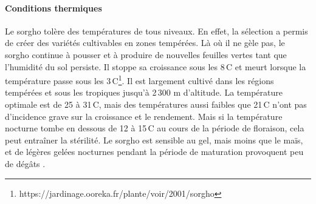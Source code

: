 \documentclass[a4paper,11pt]{article}
\begin{document}
\paragraph{Conditions thermiques} Le sorgho tolère des températures de
tous niveaux. En effet, la sélection a permis de créer des variétés
cultivables en zones tempérées. Là où il ne gèle pas, le sorgho
continue à pousser et à produire de nouvelles feuilles vertes tant que
l'humidité du sol persiste. Il stoppe sa croissance sous les
8\,\degree{}C et meurt lorsque la température passe sous les
3\,\degree{}C\footnote{https://jardinage.ooreka.fr/plante/voir/2001/sorgho}. Il
est largement cultivé dans les régions tempérées et sous les tropiques
jusqu'à 2\,300 m d'altitude. La température optimale est de 25 à
31\,\degree{}C, mais des températures aussi faibles que 21\,\degree{}C
n'ont pas d'incidence grave sur la croissance et le rendement. Mais si
la température nocturne tombe en dessous de 12 à 15\,\degree{}C au
cours de la période de floraison, cela peut entraîner la stérilité. Le
sorgho est sensible au gel, mais moins que le maïs, et de légères
gelées nocturnes pendant la période de maturation provoquent peu de
dégâts \cite{BARRO_KONDOMBO_2010}.
\end{document}
